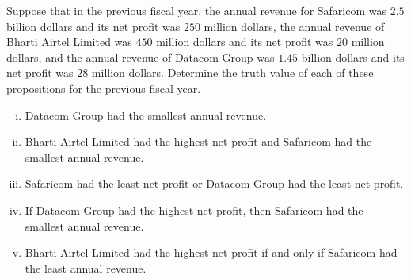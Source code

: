 {%
%
%
%       
%        

}


%

%
Suppose that in the previous fiscal year, the annual revenue for Safaricom was $2.5$ billion dollars and its net profit was $250$ million dollars, the annual revenue of Bharti Airtel Limited was $450$ million dollars and its net proﬁt was $20$ million dollars, and the annual revenue of Datacom Group was $1.45$ billion dollars and its net proﬁt was $28$ million dollars. Determine the truth value of each of these propositions for the previous ﬁscal year.

 \begin{enumerate}[(i)]
\item Datacom Group had the smallest annual revenue.
\item Bharti Airtel Limited had the highest net proﬁt and Safaricom had the smallest annual revenue.
\item Safaricom had the least net proﬁt or Datacom Group had the least net proﬁt.
\item If Datacom Group had the highest net proﬁt, then Safaricom had the smallest annual revenue.
\item Bharti Airtel Limited had the highest net proﬁt if and only if Safaricom had the least annual revenue.
\end{enumerate}

